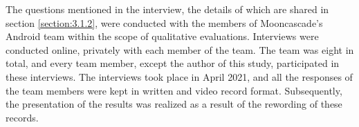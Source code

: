 The questions mentioned in the interview, the details of which are shared in section \ref{section:3.1.2}, were conducted with the members of Mooncascade's Android team within the scope of qualitative evaluations. Interviews were conducted online, privately with each member of the team. The team was eight in total, and every team member, except the author of this study, participated in these interviews. The interviews took place in April 2021, and all the responses of the team members were kept in written and video record format. Subsequently, the presentation of the results was realized as a result of the rewording of these records.